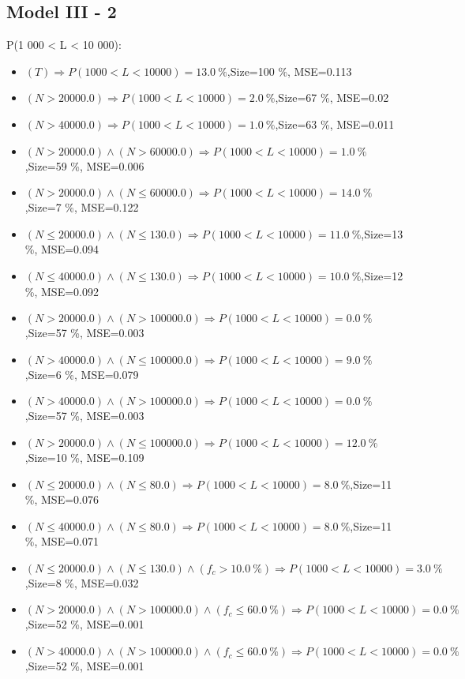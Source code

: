 \documentclass[numbered]{CSL}
\begin{document}
\subsection{Model III - 2}
P(1 000 < L < 10 000):
\begin{itemize}
\item $(T) \Rightarrow P(1 000 < L < 10 000) = 13.0~\%$,\hfill Size=100 \%, MSE=0.113
\item $(N > 20000.0) \Rightarrow P(1 000 < L < 10 000) = 2.0~\%$,\hfill Size=67 \%, MSE=0.02
\item $(N > 40000.0) \Rightarrow P(1 000 < L < 10 000) = 1.0~\%$,\hfill Size=63 \%, MSE=0.011
\item $(N > 20000.0) \land (N > 60000.0) \Rightarrow P(1 000 < L < 10 000) = 1.0~\%$,\hfill Size=59 \%, MSE=0.006
\item $(N > 20000.0) \land (N \leq 60000.0) \Rightarrow P(1 000 < L < 10 000) = 14.0~\%$,\hfill Size=7 \%, MSE=0.122
\item $(N \leq 20000.0) \land (N \leq 130.0) \Rightarrow P(1 000 < L < 10 000) = 11.0~\%$,\hfill Size=13 \%, MSE=0.094
\item $(N \leq 40000.0) \land (N \leq 130.0) \Rightarrow P(1 000 < L < 10 000) = 10.0~\%$,\hfill Size=12 \%, MSE=0.092
\item $(N > 20000.0) \land (N > 100000.0) \Rightarrow P(1 000 < L < 10 000) = 0.0~\%$,\hfill Size=57 \%, MSE=0.003
\item $(N > 40000.0) \land (N \leq 100000.0) \Rightarrow P(1 000 < L < 10 000) = 9.0~\%$,\hfill Size=6 \%, MSE=0.079
\item $(N > 40000.0) \land (N > 100000.0) \Rightarrow P(1 000 < L < 10 000) = 0.0~\%$,\hfill Size=57 \%, MSE=0.003
\item $(N > 20000.0) \land (N \leq 100000.0) \Rightarrow P(1 000 < L < 10 000) = 12.0~\%$,\hfill Size=10 \%, MSE=0.109
\item $(N \leq 20000.0) \land (N \leq 80.0) \Rightarrow P(1 000 < L < 10 000) = 8.0~\%$,\hfill Size=11 \%, MSE=0.076
\item $(N \leq 40000.0) \land (N \leq 80.0) \Rightarrow P(1 000 < L < 10 000) = 8.0~\%$,\hfill Size=11 \%, MSE=0.071
\item $(N \leq 20000.0) \land (N \leq 130.0) \land (f_c > 10.0~\%) \Rightarrow P(1 000 < L < 10 000) = 3.0~\%$,\hfill Size=8 \%, MSE=0.032
\item $(N > 20000.0) \land (N > 100000.0) \land (f_c \leq 60.0~\%) \Rightarrow P(1 000 < L < 10 000) = 0.0~\%$,\hfill Size=52 \%, MSE=0.001
\item $(N > 40000.0) \land (N > 100000.0) \land (f_c \leq 60.0~\%) \Rightarrow P(1 000 < L < 10 000) = 0.0~\%$,\hfill Size=52 \%, MSE=0.001

\end{itemize}
\end{document}
